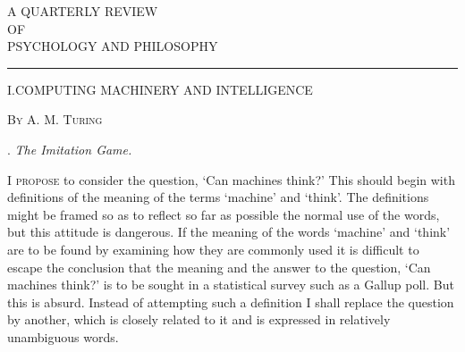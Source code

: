 \documentclass[10pt]{article} %
\newcommand{\articletitle}[1]{%
    \vspace*{0.7cm} %
    \begin{center}%
        {\normalfont\LARGE{#1}}%
    \end{center}%
    \par\vspace{0.2cm}%
}
\newcommand{\articleauthor}[1]{%
    \begin{center}%
        {\normalfont#1}%
    \end{center}%
    \par\vspace{0.5cm}%
}
\begin{document}
\thispagestyle{firstpage} %


\vspace*{1.2cm} %
\begin{center}
    {\Huge{}}
\end{center}

\vspace*{0.5cm} %
\begin{center}
    {\large A QUARTERLY REVIEW} \\
    \vspace{0.1cm} %
    {\normalsize OF} \\
    \vspace{0.1cm} %
    {\large PSYCHOLOGY AND PHILOSOPHY}
\end{center}

\vspace*{0.5cm} %
\begin{center}
    \rule{3cm}{0.75pt} %
\end{center}
\vspace*{0.7cm} %

\articletitle{I.\textemdash COMPUTING MACHINERY AND INTELLIGENCE} %
\articleauthor{\textsc{By A. M. Turing}} %

\noindent{}. \textit{The Imitation Game.}
\vspace{0.5\baselineskip} %

\noindent\normalfont I \textsc{propose} to consider the question, `Can machines think?' This should begin with definitions of the meaning of the terms `machine' and `think'. The definitions might be framed so as to reflect so far as possible the normal use of the words, but this attitude is dangerous. If the meaning of the words `machine' and `think' are to be found by examining how they are commonly used it is difficult to escape the conclusion that the meaning and the answer to the question, `Can machines think?' is to be sought in a statistical survey such as a Gallup poll. But this is absurd. Instead of attempting such a definition I shall replace the question by another, which is closely related to it and is expressed in relatively unambiguous words.
\end{document}
